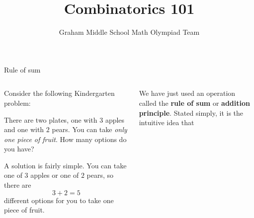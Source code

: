 \documentclass[9pt,aspectratio=169]{beamer}
\title{Combinatorics 101}
\subtitle[Graham Middle School]{Graham Middle School Math Olympiad Team}
\begin{document}
\maketitle

\begin{frame}{Rule of sum}
  \begin{columns}[T]
    \begin{column}{0.5\textwidth}
      Consider the following Kindergarten problem:

      \begin{problem}{}
        There are two plates, one with $3$ apples and one with $2$ pears. You can take \emph{only one piece of fruit}. How many options do you have?
      \end{problem}
  
      \begin{nscenter}
      \end{nscenter}

      A solution is fairly simple. You can take one of $3$ apples or one of $2$ pears, so there are
      \[ 3 + 2 = 5 \]
      different options for you to take one piece of fruit.
    \end{column}
    \begin{column}{0.5\textwidth}
      We have just used an operation called the \textbf{rule of sum} or \textbf{addition principle}. Stated simply, it is the intuitive idea that 


\end{column}
\end{columns}
\end{frame}
\end{document}
